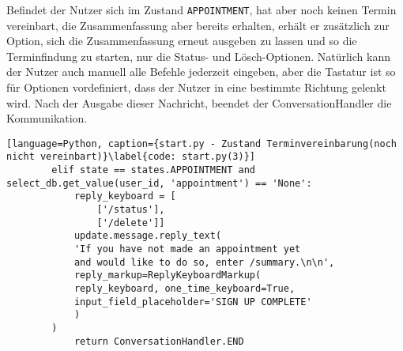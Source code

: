             Befindet der Nutzer sich im Zustand \verb|APPOINTMENT|, hat aber noch keinen Termin vereinbart, die Zusammenfassung aber bereits erhalten, erhält er zusätzlich zur Option, sich die Zusammenfassung erneut ausgeben zu lassen und so die Terminfindung zu starten, nur die Status- und Lösch-Optionen. Natürlich kann der Nutzer auch manuell alle Befehle jederzeit eingeben, aber die Tastatur ist so für Optionen vordefiniert, dass der Nutzer in eine bestimmte Richtung gelenkt wird. Nach der Ausgabe dieser Nachricht, beendet der ConversationHandler die Kommunikation.
            \begin{lstlisting}[language=Python, caption={start.py - Zustand Terminvereinbarung(noch nicht vereinbart)}\label{code: start.py(3)}]
        elif state == states.APPOINTMENT and select_db.get_value(user_id, 'appointment') == 'None':
            reply_keyboard = [
                ['/status'], 
                ['/delete']]
            update.message.reply_text(
            'If you have not made an appointment yet 
            and would like to do so, enter /summary.\n\n',
            reply_markup=ReplyKeyboardMarkup(
            reply_keyboard, one_time_keyboard=True, 
            input_field_placeholder='SIGN UP COMPLETE'
            )
        )
            return ConversationHandler.END
            \end{lstlisting}

